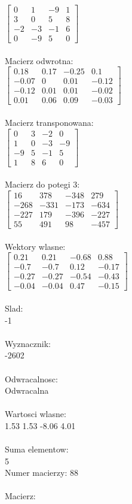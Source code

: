 \documentclass[a4paper,12pt]{article}
\begin{document}
$\begin{bmatrix} 0&1&-9&1\\3&0&5&8\\-2&-3&-1&6\\0&-9&5&0 \end{bmatrix}$
\\
\\
Macierz odwrotna:\\

$\begin{bmatrix} 0.18&0.17&-0.25&0.1\\-0.07&0&0.01&-0.12\\-0.12&0.01&0.01&-0.02\\0.01&0.06&0.09&-0.03 \end{bmatrix}$
\\
\\
Macierz transponowana:\\

$\begin{bmatrix} 0&3&-2&0\\1&0&-3&-9\\-9&5&-1&5\\1&8&6&0 \end{bmatrix}$
\\
\\
Macierz do potegi 3:\\

$\begin{bmatrix} 16&378&-348&279\\-268&-331&-173&-634\\-227&179&-396&-227\\55&491&98&-457 \end{bmatrix}$
\\
\\
Wektory wlasne:\\

$\begin{bmatrix} 0.21&0.21&-0.68&0.88\\-0.7&-0.7&0.12&-0.17\\-0.27&-0.27&-0.54&-0.43\\-0.04&-0.04&0.47&-0.15 \end{bmatrix}$
\\
\\
Slad:\\
-1
\\
\\
Wyznacznik:\\
-2602
\\
\\
Odwracalnosc:\\
Odwracalna
\\
\\
Wartosci wlasne:\\
1.53 1.53 -8.06 4.01
\\
\\
Suma elementow:\\
5
\\
\newpage
Numer macierzy:
88
\\
\\
Macierz:\\
\end{document}

